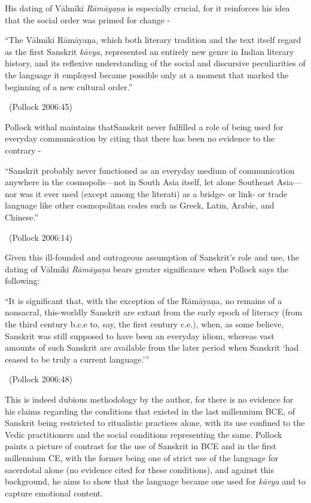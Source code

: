 His dating of Vālmīki \textit{Rāmāyaṇa} is especially crucial, for it reinforces his idea that the social order was primed for change -

\begin{myquote}
“The Vālmīki Rāmāyaṇa, which both literary tradition and the text itself regard as the first Sanskrit \textit{kāvya}, represented an entirely new genre in Indian literary history, and its reflexive understanding of the social and discursive peculiarities of the language it employed became possible only at a moment that marked the beginning of a new cultural order.” 

~\hfill (Pollock 2006:45)
\end{myquote}

Pollock withal maintains thatSanskrit never fulfilled a role of being used for everyday communication by citing that there has been no evidence to the contrary -

\begin{myquote}
“Sanskrit probably never functioned as an everyday medium of communication anywhere in the cosmopolis—not in South Asia itself, let alone Southeast Asia— nor was it ever used (except among the literati) as a bridge- or link- or trade language like other cosmopolitan codes such as Greek, Latin, Arabic, and Chinese.” 

~\hfill (Pollock 2006:14)
\end{myquote}

Given this ill-founded and outrageous assumption of Sanskrit’s role and use, the dating of Vālmīki \textit{Rāmāyaṇa} bears greater significance when Pollock says the following:

\begin{myquote}
“It is significant that, with the exception of the Rāmāyaṇa\textit{,} no remains of a nonsacral, this-worldly Sanskrit are extant from the early epoch of literacy (from the third century b.c.e to, say, the first century c.e.), when, as some believe, Sanskrit was still supposed to have been an everyday idiom, whereas vast amounts of such Sanskrit are available from the later period when Sanskrit ‘had ceased to be truly a current language.’” 

~\hfill (Pollock 2006:48)
\end{myquote}

This is indeed dubious methodology by the author, for there is no evidence for his claims regarding the conditions that existed in the last millennium BCE, of Sanskrit being restricted to ritualistic practices alone, with its use confined to the Vedic practitioners and the social conditions representing the same. Pollock paints a picture of contrast for the use of Sanskrit in BCE and in the first millennium CE, with the former being one of strict use of the language for sacerdotal alone (no evidence cited for these conditions), and against this background, he aims to show that the language became one used for \textit{kāvya} and to capture emotional content.

